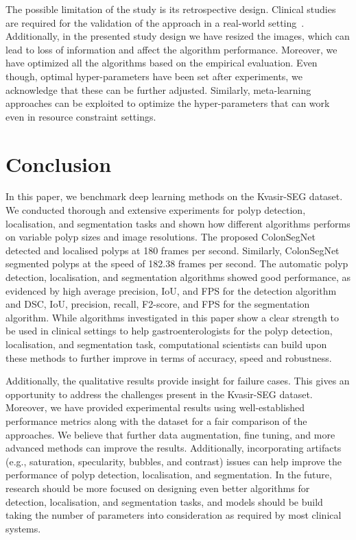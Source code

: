 \documentclass[journal]{IEEEtran}
\begin{document}
The possible limitation of the study is its retrospective design. Clinical studies are required for the validation of the approach in a real-world setting~\cite{mori2018real}. Additionally, in the presented study design we have resized the images, which can lead to loss of information and affect the algorithm performance. Moreover, we have optimized all the algorithms based on the empirical evaluation. Even though, optimal hyper-parameters have been set after experiments, we acknowledge that these can be further adjusted. Similarly, meta-learning approaches can be exploited to optimize the hyper-parameters that can work even in resource constraint settings.
\section{Conclusion}
\label{sec:conclusion}
 In this paper, we benchmark deep learning methods on the Kvasir-SEG dataset. We conducted thorough and extensive experiments for polyp detection, localisation, and segmentation tasks and shown how different algorithms performs on variable polyp sizes and image resolutions. The proposed ColonSegNet detected and localised polyps at 180 frames per second. Similarly, ColonSegNet segmented polyps at the speed of 182.38 frames per second. The automatic polyp detection, localisation, and segmentation algorithms showed good performance, as evidenced by high average precision, IoU, and \ac{FPS} for the detection algorithm and DSC, IoU, precision, recall, F2-score, and FPS for the segmentation algorithm. While algorithms investigated in this paper show a clear strength to be used in clinical settings to help gastroenterologists for the polyp detection, localisation, and segmentation task, computational scientists can build upon these methods to further improve in terms of accuracy, speed and robustness. 

Additionally, the qualitative results provide insight for failure cases. This gives an opportunity to address the challenges present in the Kvasir-SEG dataset.  Moreover, we have provided experimental results using well-established performance metrics along with the dataset for a fair comparison of the approaches. We believe that further data augmentation, fine tuning, and more advanced methods can improve the results. Additionally, incorporating artifacts~\cite{ali2021deep} (e.g., saturation, specularity, bubbles, and contrast) issues can help improve the performance of polyp detection, localisation, and segmentation. In the future, research should be more focused on designing even better algorithms for detection, localisation, and segmentation tasks, and models should be build taking the number of parameters into consideration as required by most clinical systems.
\end{document}
